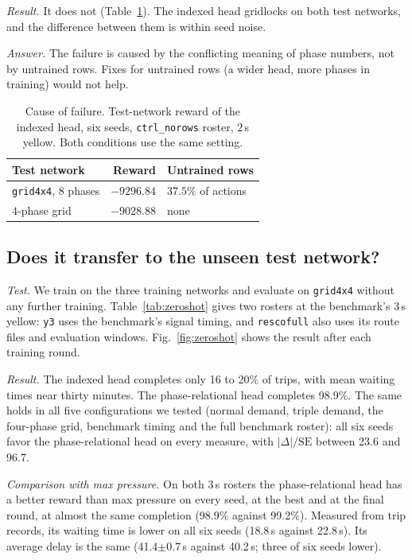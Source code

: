 \documentclass[conference]{IEEEtran}
\begin{document}
\emph{Result.} It does not (Table~\ref{tab:control}). The indexed head gridlocks on both
test networks, and the difference between them is within seed noise.

\emph{Answer.} The failure is caused by the conflicting meaning of phase numbers, not by
untrained rows. Fixes for untrained rows (a wider head, more phases in training) would not
help.

\begin{table}[ht]
\caption{Cause of failure. Test-network reward of the indexed head, six seeds,
\texttt{ctrl\_norows} roster, $2$\,s yellow. Both conditions use the same setting.}
\label{tab:control}
\centering\footnotesize
\begin{tabular}{@{}lrl@{}}
\toprule
Test network & Reward & Untrained rows \\
\midrule
\texttt{grid4x4}, $8$ phases & $-9296.84$ & $37.5\%$ of actions \\
$4$-phase grid & $-9028.88$ & none \\
\bottomrule
\end{tabular}
\end{table}

\subsection{Does it transfer to the unseen test network?}\label{sec:zeroshot}
\emph{Test.} We train on the three training networks and evaluate on \texttt{grid4x4}
without any further training. Table~\ref{tab:zeroshot} gives two rosters at the
benchmark's 3\,s yellow: \texttt{y3} uses the benchmark's signal timing, and
\texttt{rescofull} also uses its route files and evaluation windows. Fig.~\ref{fig:zeroshot}
shows the result after each training round.

\emph{Result.} The indexed head completes only 16 to 20\% of trips, with mean waiting
times near thirty minutes. The phase-relational head completes 98.9\%. The same holds in
all five configurations we tested (normal demand, triple demand, the four-phase grid,
benchmark timing and the full benchmark roster): all six seeds favor the
phase-relational head on every measure, with $|\Delta|/\mathrm{SE}$ between 23.6 and 96.7.

\emph{Comparison with max pressure.} On both 3\,s rosters the phase-relational head has a
better reward than max pressure on every seed, at the best and at the final round, at
almost the same completion (98.9\% against 99.2\%). Measured from trip records, its waiting
time is lower on all six seeds (18.8\,s against 22.8\,s). Its average delay is the same
(41.4$\pm$0.7\,s against 40.2\,s; three of six seeds lower).
\end{document}
